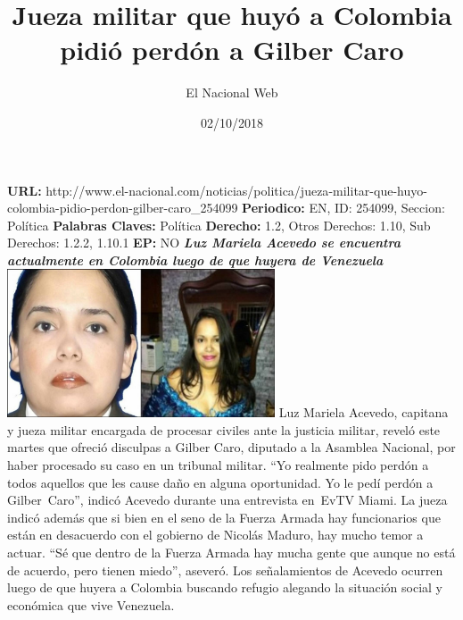 \documentclass{article}%
\title{\textbf{Jueza militar que huyó a Colombia pidió perdón a Gilber Caro}}%
\author{El Nacional Web}%
\date{02/10/2018}%
\begin{document}
%
\normalsize%
\maketitle%
\textbf{URL: }%
http://www.el{-}nacional.com/noticias/politica/jueza{-}militar{-}que{-}huyo{-}colombia{-}pidio{-}perdon{-}gilber{-}caro\_254099\newline%
%
\textbf{Periodico: }%
EN, %
ID: %
254099, %
Seccion: %
Política\newline%
%
\textbf{Palabras Claves: }%
Política\newline%
%
\textbf{Derecho: }%
1.2, %
Otros Derechos: %
1.10, %
Sub Derechos: %
1.2.2, 1.10.1\newline%
%
\textbf{EP: }%
NO\newline%
\newline%
%
\textbf{\textit{Luz Mariela Acevedo se encuentra actualmente en Colombia luego de que huyera de Venezuela}}%
\newline%
\newline%
%
\includegraphics[width=300px]{59.jpg}%
\newline%
%
Luz Mariela Acevedo, capitana y jueza militar encargada de procesar civiles ante la justicia militar, reveló este martes que ofreció disculpas a Gilber Caro, diputado a la Asamblea Nacional, por haber procesado su caso en un tribunal militar.%
\newline%
%
“Yo realmente pido perdón a todos aquellos que les cause daño en alguna oportunidad. Yo le pedí perdón a Gilber~Caro”, indicó Acevedo durante una entrevista en~EvTV Miami.%
\newline%
%
La jueza indicó además que si bien en el seno de la Fuerza Armada hay funcionarios que están en desacuerdo con el gobierno de Nicolás Maduro, hay mucho temor a actuar.%
\newline%
%
“Sé que dentro de la Fuerza Armada hay mucha gente que aunque no está de acuerdo, pero tienen miedo”, aseveró.%
\newline%
%
Los señalamientos de Acevedo ocurren luego de que huyera a Colombia buscando refugio alegando la situación social y económica que vive Venezuela.%
\newline%
%
\end{document}
